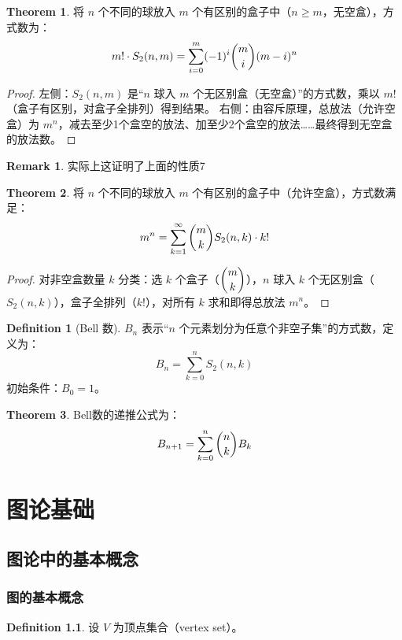 \documentclass[oneside]{book}
\theoremstyle{definition}
\newtheorem{definition}{Definition}[section]
\newtheorem{theorem}{Theorem}[section]
\newtheorem{remark}{Remark}[section]
\begin{document}
\begin{theorem}
	将 \( n \) 个不同的球放入 \( m \) 个有区别的盒子中（\( n \geq m \)，无空盒），方式数为：
	\[
	m! \cdot S_2(n, m) = \sum_{i=0}^m (-1)^i \dbinom{m}{i} (m - i)^n
	\]
\end{theorem}
\begin{proof}
	左侧：\( S_2(n, m) \) 是“\( n \) 球入 \( m \) 个无区别盒（无空盒）”的方式数，乘以 \( m! \)（盒子有区别，对盒子全排列）得到结果。
	右侧：由容斥原理，总放法（允许空盒）为 \( m^n \)，减去至少1个盒空的放法、加至少2个盒空的放法……最终得到无空盒的放法数。
\end{proof}
\begin{remark}
	实际上这证明了上面的性质7
\end{remark}
\begin{theorem}
	将 \( n \) 个不同的球放入 \( m \) 个有区别的盒子中（允许空盒），方式数满足：
	\[
	m^n = \sum_{k=1}^{\infty} \dbinom{m}{k} S_2(n, k) \cdot k!
	\]
\end{theorem}
\begin{proof}
	对非空盒数量 \( k \) 分类：选 \( k \) 个盒子（\( \dbinom{m}{k} \)），\( n \) 球入 \( k \) 个无区别盒（\( S_2(n, k) \)），盒子全排列（\( k! \)），对所有 \( k \) 求和即得总放法 \( m^n \)。
\end{proof}


\begin{definition}[Bell 数]
\( B_n \) 表示“\( n \) 个元素划分为任意个非空子集”的方式数，定义为：
	\[
	B_n = \sum_{k=0}^n S_2(n, k)
	\]
	初始条件：\( B_0 = 1 \)。
\end{definition}


\begin{theorem}
	Bell数的递推公式为：
	\[
	B_{n+1} = \sum_{k=0}^n \dbinom{n}{k} B_k
	\]
\end{theorem}


\part{图论基础}
\chapter{图论中的基本概念}
\section{图的基本概念}

\begin{definition}
	设 \( V \) 为顶点集合（vertex set）。
\end{definition}
\end{document}
